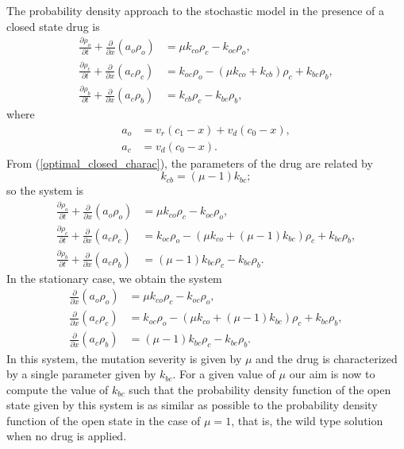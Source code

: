 The probability density approach to the stochastic model in the presence of a closed state drug is
\begin{align*}
\frac{\partial\rho_{o}}{\partial t}+\frac{\partial}{\partial x}\left(
a_{o}\rho_{o}\right)   &  =\mu k_{co}\rho_{c}-k_{oc}\rho_{o},\\
\frac{\partial\rho_{c}}{\partial t}+\frac{\partial}{\partial x}\left(
a_{c}\rho_{c}\right)   &  =k_{oc}\rho_{o}-\left(  \mu k_{co}+k_{cb}\right)
\rho_{c}+k_{bc}\rho_{b},\\
\frac{\partial\rho_{b}}{\partial t}+\frac{\partial}{\partial x}\left(
a_{c}\rho_{b}\right)   &  =k_{cb}\rho_{c}-k_{bc}\rho_{b},
\end{align*}
where 
\begin{align*}
a_{o} &  =v_{r}(c_{1}-x)+v_{d}(c_{0}-x),\\
a_{c} &  =v_{d}(c_{0}-x).
\end{align*}
From (\ref{optimal_closed_charac}), the parameters of the drug are related by
\begin{equation}
k_{cb}=\left(  \mu-1\right)  k_{bc};  \label{kcb}
\end{equation}
so the system is
\begin{align*}
\frac{\partial\rho_{o}}{\partial t}+\frac{\partial}{\partial x}\left(
a_{o}\rho_{o}\right)   &  =\mu k_{co}\rho_{c}-k_{oc}\rho_{o},\\
\frac{\partial\rho_{c}}{\partial t}+\frac{\partial}{\partial x}\left(
a_{c}\rho_{c}\right)   &  =k_{oc}\rho_{o}-\left(  \mu k_{co}+\left(
\mu-1\right)  k_{bc}\right)  \rho_{c}+k_{bc}\rho_{b},\\
\frac{\partial\rho_{b}}{\partial t}+\frac{\partial}{\partial x}\left(
a_{c}\rho_{b}\right)   &  =\left(  \mu-1\right)  k_{bc}\rho_{c}-k_{bc}\rho
_{b}.
\end{align*}
In the stationary case, we obtain the system
\begin{align}
\frac{\partial}{\partial x}\left(  a_{o}\rho_{o}\right)   &  =\mu k_{co}
\rho_{c}-k_{oc}\rho_{o}, \label{st1} \\
\frac{\partial}{\partial x}\left(  a_{c}\rho_{c}\right)   &  =k_{oc}\rho
_{o}-\left(  \mu k_{co}+\left(  \mu-1\right)  k_{bc}\right)  \rho_{c}
+k_{bc}\rho_{b},  \label{st2}\\
\frac{\partial}{\partial x}\left(  a_{c}\rho_{b}\right)   &  =\left(
\mu-1\right)  k_{bc}\rho_{c}-k_{bc}\rho_{b}  \label{st3}.
\end{align}
In this system, the mutation severity is given by $\mu$ and the drug is characterized by a single parameter given by $k_{bc}$. For a given value of $\mu$ our aim is now to compute the value of $k_{bc}$ such that the probability density function of the open state given by this system is as similar as possible to the probability density function of the open state in the case of $\mu=1$, that is, the wild type solution when no drug is applied.



